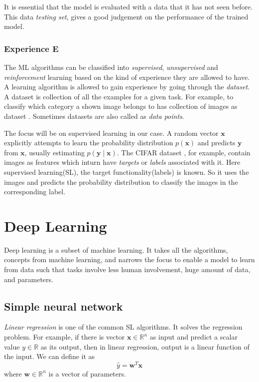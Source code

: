 It is essential that the model is evaluated with a data that it has not seen before. This data
\textit{testing set}, gives a good judgement on the performance  of the trained model.

\subsubsection*{Experience E}
The ML algorithms can be classified into \textit{supervised}, \textit{unsupervised} and
\textit{reinforcement} learning based on the kind of experience they are allowed to have.
A learning algorithm is allowed to gain experience by going through the \textit{dataset}.
A dataset is collection of all the examples for a given task. For example, to classify
which category a shown image belongs to has collection of images as dataset
\cite{cifar10}. Sometimes datasets are also called as \textit{data points}.

The focus will be on supervised learning in our case.  A random vector $\mathbf{x}$ explicitly attempts to
learn the probability distribution $p(\mathbf{x})$ and predicts $\mathbf{y}$ from
$\mathbf{x}$, usually estimating $p(\mathbf{y}\mid\mathbf{x})$. The CIFAR
dataset \cite{cifar10}, for example, contain images as features which inturn have \textit{targets} or
\textit{labels} associated with it. Here supervised learning(SL), the target
functionality(labels) is known. So it uses the images and predicts the probability
distribution to classify the images in the corresponding label.

\section{Deep Learning}
\label{chapter2sec:deeplearning}
Deep learning is a subset of machine learning. It takes all the algorithms, concepts from
 machine learning, and narrows the focus to enable a model to learn from data such that tasks
involve less human involvement, huge amount of data, and parameters.


\subsection{Simple neural network}
\textit{Linear regression} is one of the common SL algorithms. It solves the regression
problem. For example, if there is vector $\mathbf{x} \in \mathbb{R}^n$ as input and
predict a scalar value $y \in \mathbb{R}$ as its output, then in linear regression, output
is a linear function of the input. We can define it as
\begin{equation}
    \hat y = \mathbf{w}^T\mathbf{x}
    \label{eq:linear equation}
\end{equation}
where $\mathbf{w} \in \mathbb{R}^n$ is a vector of parameters.

